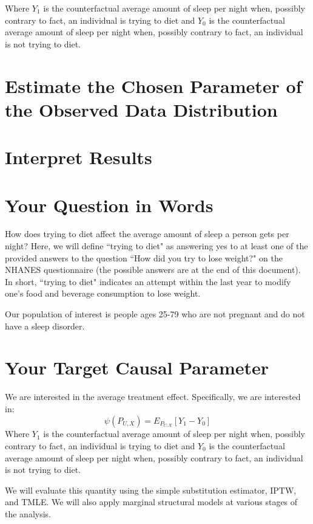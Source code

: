\documentclass{article}
\begin{document}
Where $Y_1$ is the counterfactual average amount of sleep per night when, possibly contrary to fact, an individual is trying to diet and $Y_0$ is the counterfactual average amount of sleep per night when, possibly contrary to fact, an individual is not trying to diet.


\section{Estimate the Chosen Parameter of the Observed Data Distribution}

\section{Interpret Results}




\section{Your Question in Words}

How does trying to diet affect the average amount of sleep a person gets per night?  Here, we will define ``trying to diet" as answering yes to at least one of the provided answers to the question  ``How did you try to lose weight?" on the NHANES questionnaire (the possible answers are at the end of this document).  In short, ``trying to diet" indicates an attempt within the last year to modify one's food and beverage consumption to lose weight.

Our population of interest is people ages 25-79 who are not pregnant and do not have a sleep disorder. 

\section{Your Target Causal Parameter}

We are interested in the average treatment effect. Specifically, we are interested in:
$$\psi(P_{U,X}) = E_{P_{U,X}}[Y_1-Y_0]$$
Where $Y_1$ is the counterfactual average amount of sleep per night when, possibly contrary to fact, an individual is trying to diet and $Y_0$ is the counterfactual average amount of sleep per night when, possibly contrary to fact, an individual is not trying to diet.

We will evaluate this quantity using the simple substitution estimator, IPTW, and TMLE. We will also apply marginal structural models at various stages of the analysis.
\end{document}
